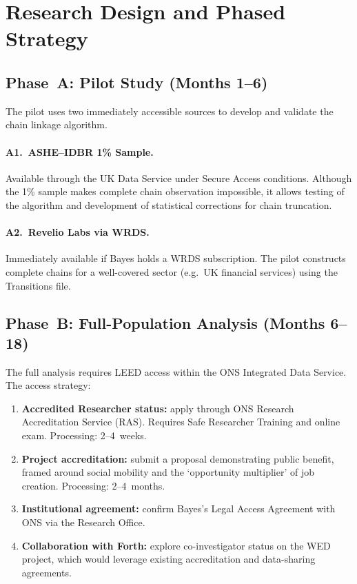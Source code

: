 \documentclass[a4paper]{tufte-handout}
\begin{document}
\section{Research Design and Phased Strategy}

\subsection{Phase~A: Pilot Study (Months 1--6)}

The pilot uses two immediately accessible sources to develop and validate the chain linkage algorithm.

\paragraph{A1.\ ASHE--IDBR 1\% Sample.}
Available through the UK Data Service under Secure Access conditions. Although the 1\% sample makes complete chain observation impossible, it allows testing of the algorithm and development of statistical corrections for chain truncation.

\paragraph{A2.\ Revelio Labs via WRDS.}
Immediately available if Bayes holds a WRDS subscription. The pilot constructs complete chains for a well-covered sector (e.g.\ UK financial services) using the Transitions file.


\subsection{Phase~B: Full-Population Analysis (Months 6--18)}

The full analysis requires LEED access within the ONS Integrated Data Service. The access strategy:

\begin{enumerate}
  \item \textbf{Accredited Researcher status:} apply through ONS Research Accreditation Service (RAS). Requires Safe Researcher Training and online exam. Processing: 2--4~weeks.
  \item \textbf{Project accreditation:} submit a proposal demonstrating public benefit, framed around social mobility and the `opportunity multiplier' of job creation. Processing: 2--4~months.
  \item \textbf{Institutional agreement:} confirm Bayes's Legal Access Agreement with ONS via the Research Office.
  \item \textbf{Collaboration with Forth:} explore co-investigator status on the WED project, which would leverage existing accreditation and data-sharing agreements.
\end{enumerate}
\end{document}
